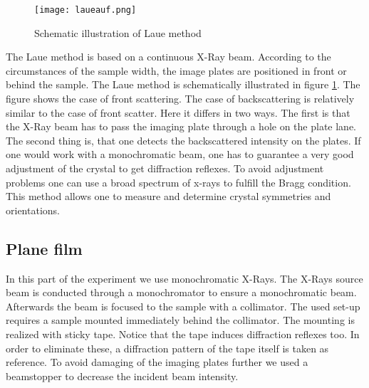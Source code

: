 	\begin{figure}[h]
		\centering
		\texttt{[image: laueauf.png]}
		\caption{Schematic illustration of Laue method}
		\label{laueauf}
	\end{figure}
	The Laue method is based on a continuous X-Ray beam. According to the circumstances of the sample width, the image plates are positioned in front or behind the sample. The Laue method is schematically illustrated in figure \ref{laueauf}. The figure shows the case of front scattering. The case of backscattering is relatively similar to the case of front scatter. Here it differs in two ways. The first is that the X-Ray beam has to pass the imaging plate through a hole on the plate lane. The second thing is, that one detects the backscattered intensity on the plates. If one would work with a monochromatic beam, one has to guarantee a very good adjustment of the crystal to get diffraction reflexes. To avoid adjustment problems one can use a broad spectrum of x-rays to fulfill the Bragg condition. This method allows one to measure and determine crystal symmetries and orientations.
	
	\subsection{Plane film}
	In this part of the experiment we use monochromatic X-Rays. The X-Rays source beam is conducted through a monochromator to ensure a monochromatic beam. Afterwards the beam is focused to the sample with a collimator. The used set-up requires a sample mounted immediately behind the collimator. The mounting is realized with sticky tape. Notice that the tape induces diffraction reflexes too. In order to eliminate these, a diffraction pattern of the tape itself is taken as reference. To avoid damaging of the imaging plates further we used a beamstopper to decrease the incident beam intensity.
	
